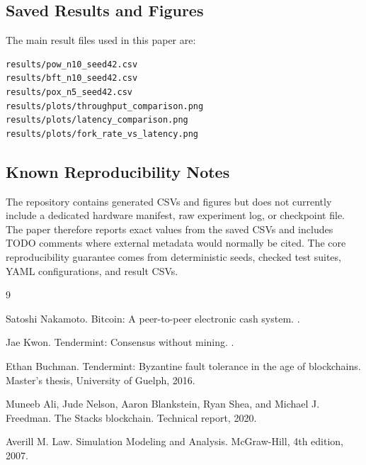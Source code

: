 \documentclass[11pt]{article}
\begin{document}
\subsection{Saved Results and Figures}

The main result files used in this paper are:
\begin{lstlisting}[language=bash]
results/pow_n10_seed42.csv
results/bft_n10_seed42.csv
results/pox_n5_seed42.csv
results/plots/throughput_comparison.png
results/plots/latency_comparison.png
results/plots/fork_rate_vs_latency.png
\end{lstlisting}

\subsection{Known Reproducibility Notes}

The repository contains generated CSVs and figures but does not currently include a dedicated hardware manifest, raw experiment log, or checkpoint file. The paper therefore reports exact values from the saved CSVs and includes TODO comments where external metadata would normally be cited. The core reproducibility guarantee comes from deterministic seeds, checked test suites, YAML configurations, and result CSVs.

\begin{thebibliography}{9}

Satoshi Nakamoto.
\newblock Bitcoin: A peer-to-peer electronic cash system.
.

Jae Kwon.
\newblock Tendermint: Consensus without mining.
.

Ethan Buchman.
\newblock Tendermint: Byzantine fault tolerance in the age of blockchains.
\newblock Master's thesis, University of Guelph, 2016.

Muneeb Ali, Jude Nelson, Aaron Blankstein, Ryan Shea, and Michael J. Freedman.
\newblock The Stacks blockchain.
\newblock Technical report, 2020.

Averill M. Law.
\newblock Simulation Modeling and Analysis.
\newblock McGraw-Hill, 4th edition, 2007.

\end{thebibliography}
\end{document}

